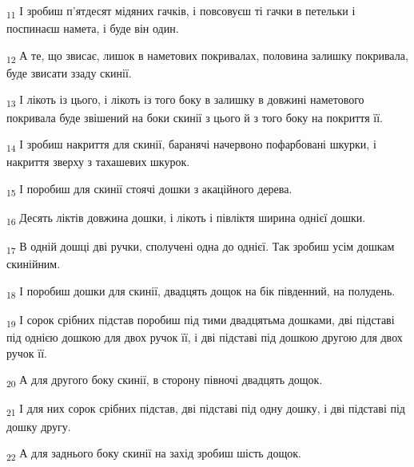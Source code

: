 \begin{tcolorbox}
\textsubscript{11} І зробиш п'ятдесят мідяних гачків, і повсовуєш ті гачки в петельки і поспинаєш намета, і буде він один.
\end{tcolorbox}
\begin{tcolorbox}
\textsubscript{12} А те, що звисає, лишок в наметових покривалах, половина залишку покривала, буде звисати ззаду скинії.
\end{tcolorbox}
\begin{tcolorbox}
\textsubscript{13} І лікоть із цього, і лікоть із того боку в залишку в довжині наметового покривала буде звішений на боки скинії з цього й з того боку на покриття її.
\end{tcolorbox}
\begin{tcolorbox}
\textsubscript{14} І зробиш накриття для скинії, баранячі начервоно пофарбовані шкурки, і накриття зверху з тахашевих шкурок.
\end{tcolorbox}
\begin{tcolorbox}
\textsubscript{15} І поробиш для скинії стоячі дошки з акаційного дерева.
\end{tcolorbox}
\begin{tcolorbox}
\textsubscript{16} Десять ліктів довжина дошки, і лікоть і півліктя ширина однієї дошки.
\end{tcolorbox}
\begin{tcolorbox}
\textsubscript{17} В одній дошці дві ручки, сполучені одна до однієї. Так зробиш усім дошкам скинійним.
\end{tcolorbox}
\begin{tcolorbox}
\textsubscript{18} І поробиш дошки для скинії, двадцять дощок на бік південний, на полудень.
\end{tcolorbox}
\begin{tcolorbox}
\textsubscript{19} І сорок срібних підстав поробиш під тими двадцятьма дошками, дві підставі під однією дошкою для двох ручок її, і дві підставі під дошкою другою для двох ручок її.
\end{tcolorbox}
\begin{tcolorbox}
\textsubscript{20} А для другого боку скинії, в сторону півночі двадцять дощок.
\end{tcolorbox}
\begin{tcolorbox}
\textsubscript{21} І для них сорок срібних підстав, дві підставі під одну дошку, і дві підставі під дошку другу.
\end{tcolorbox}
\begin{tcolorbox}
\textsubscript{22} А для заднього боку скинії на захід зробиш шість дощок.
\end{tcolorbox}
